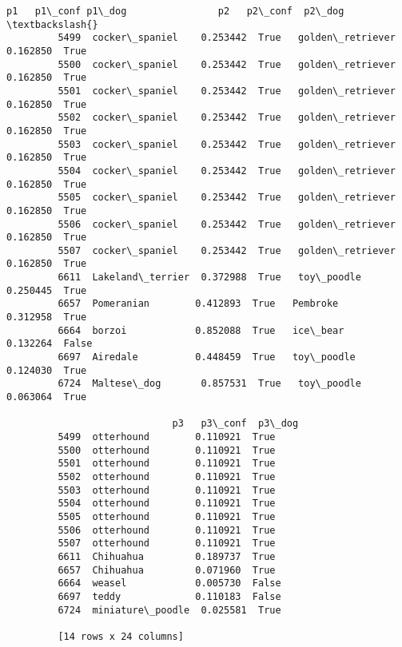 \documentclass[11pt]{article}
\begin{document}
\begin{Verbatim}[commandchars=\\\{\}]
                             p1   p1\_conf p1\_dog                p2   p2\_conf  p2\_dog  \textbackslash{}
         5499  cocker\_spaniel    0.253442  True   golden\_retriever  0.162850  True     
         5500  cocker\_spaniel    0.253442  True   golden\_retriever  0.162850  True     
         5501  cocker\_spaniel    0.253442  True   golden\_retriever  0.162850  True     
         5502  cocker\_spaniel    0.253442  True   golden\_retriever  0.162850  True     
         5503  cocker\_spaniel    0.253442  True   golden\_retriever  0.162850  True     
         5504  cocker\_spaniel    0.253442  True   golden\_retriever  0.162850  True     
         5505  cocker\_spaniel    0.253442  True   golden\_retriever  0.162850  True     
         5506  cocker\_spaniel    0.253442  True   golden\_retriever  0.162850  True     
         5507  cocker\_spaniel    0.253442  True   golden\_retriever  0.162850  True     
         6611  Lakeland\_terrier  0.372988  True   toy\_poodle        0.250445  True     
         6657  Pomeranian        0.412893  True   Pembroke          0.312958  True     
         6664  borzoi            0.852088  True   ice\_bear          0.132264  False    
         6697  Airedale          0.448459  True   toy\_poodle        0.124030  True     
         6724  Maltese\_dog       0.857531  True   toy\_poodle        0.063064  True     
         
                             p3   p3\_conf  p3\_dog  
         5499  otterhound        0.110921  True    
         5500  otterhound        0.110921  True    
         5501  otterhound        0.110921  True    
         5502  otterhound        0.110921  True    
         5503  otterhound        0.110921  True    
         5504  otterhound        0.110921  True    
         5505  otterhound        0.110921  True    
         5506  otterhound        0.110921  True    
         5507  otterhound        0.110921  True    
         6611  Chihuahua         0.189737  True    
         6657  Chihuahua         0.071960  True    
         6664  weasel            0.005730  False   
         6697  teddy             0.110183  False   
         6724  miniature\_poodle  0.025581  True    
         
         [14 rows x 24 columns]
\end{Verbatim}
            
\end{document}
